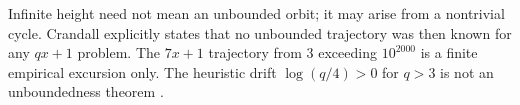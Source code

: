 \begin{nonclaim}
\label{nonclaim:Crandall-qxr-unboundedness}
Infinite height need not mean an unbounded orbit; it may arise from a
nontrivial cycle.  Crandall explicitly states that no unbounded trajectory
was then known for any $qx+1$ problem.  The $7x+1$ trajectory from $3$
exceeding $10^{2000}$ is a finite empirical excursion only.  The heuristic
drift $\log(q/4)>0$ for $q>3$ is not an unboundedness theorem
\cite[pp.~1291--1292]{Crandall1978}.
\end{nonclaim}
